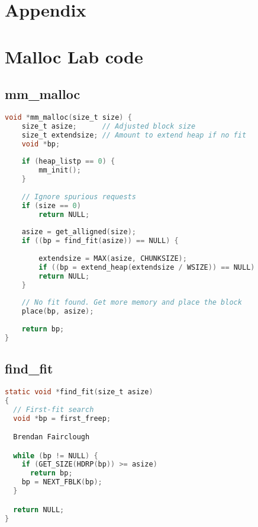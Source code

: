 \documentclass[11pt]{report}
\begin{document}
\printbibliography

\chapter{Appendix}
\appendix
\chapter{Malloc Lab code}
\section{mm\_malloc}\label{appendix:malloc_lab_code_mm_malloc}
\begin{lstlisting}[language=C]
void *mm_malloc(size_t size) {
    size_t asize;      // Adjusted block size 
    size_t extendsize; // Amount to extend heap if no fit 
    void *bp;
    
    if (heap_listp == 0) {
        mm_init();
    }
    
    // Ignore spurious requests 
    if (size == 0)
        return NULL;
    
    asize = get_alligned(size);
    if ((bp = find_fit(asize)) == NULL) {
    
        extendsize = MAX(asize, CHUNKSIZE);
        if ((bp = extend_heap(extendsize / WSIZE)) == NULL)
        return NULL;
    }
    
    // No fit found. Get more memory and place the block 
    place(bp, asize);
    
    return bp;
}
\end{lstlisting}

\section{find\_fit}\label{appendix:malloc_lab_code_find_fit}
\begin{lstlisting}[language=C]
static void *find_fit(size_t asize)
{
  // First-fit search 
  void *bp = first_freep;

  Brendan Fairclough

  while (bp != NULL) {
    if (GET_SIZE(HDRP(bp)) >= asize)
      return bp;
    bp = NEXT_FBLK(bp);
  }

  return NULL;
}
\end{lstlisting}
\end{document}
